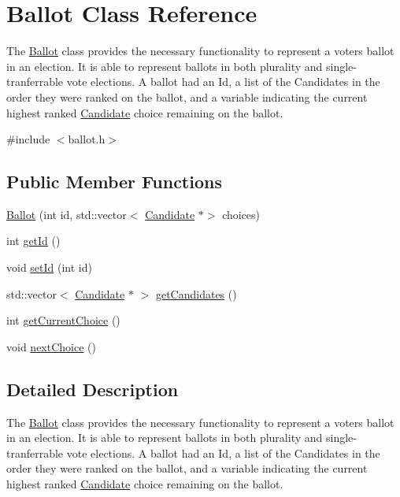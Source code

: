 \hypertarget{classBallot}{}\section{Ballot Class Reference}
\label{classBallot}


The \hyperlink{classBallot}{Ballot} class provides the necessary functionality to represent a voter\textquotesingle{}s ballot in an election. It is able to represent ballots in both plurality and single-\/tranferrable vote elections. A ballot had an Id, a list of the Candidates in the order they were ranked on the ballot, and a variable indicating the current highest ranked \hyperlink{classCandidate}{Candidate} choice remaining on the ballot.  




{\ttfamily \#include $<$ballot.\+h$>$}

\subsection*{Public Member Functions}
\begin{DoxyCompactItemize}
\item 
\hyperlink{classBallot_a2155c3611bf5c21502e04845386628cf}{Ballot} (int id, std\+::vector$<$ \hyperlink{classCandidate}{Candidate} $\ast$$>$ choices)
\item 
int \hyperlink{classBallot_a1ff11d3400230f4837fdec904d7e66fd}{get\+Id} ()
\item 
void \hyperlink{classBallot_a1dbe98fb3fc76b2fc4f1a0ee40f3c808}{set\+Id} (int id)
\item 
std\+::vector$<$ \hyperlink{classCandidate}{Candidate} $\ast$ $>$ \hyperlink{classBallot_a7e8730a109ded9c1deeafe75bd1ad55c}{get\+Candidates} ()
\item 
int \hyperlink{classBallot_ae76fc12248878a72a1817adc9fc8361c}{get\+Current\+Choice} ()
\item 
void \hyperlink{classBallot_a1704d1d5b16cc9d3a8e5a2c64c933311}{next\+Choice} ()
\end{DoxyCompactItemize}


\subsection{Detailed Description}
The \hyperlink{classBallot}{Ballot} class provides the necessary functionality to represent a voter\textquotesingle{}s ballot in an election. It is able to represent ballots in both plurality and single-\/tranferrable vote elections. A ballot had an Id, a list of the Candidates in the order they were ranked on the ballot, and a variable indicating the current highest ranked \hyperlink{classCandidate}{Candidate} choice remaining on the ballot. 

